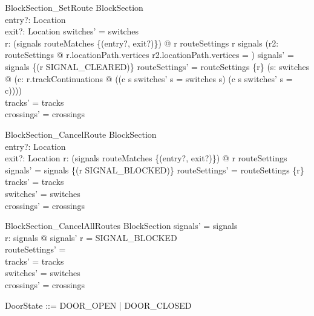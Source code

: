 \begin{schema}{BlockSection\_SetRoute}
  \Delta BlockSection\\
  entry?: Location\\
  exit?: Location
\where
  \dom  switches' = \dom  switches\\
  \exists  r: \dom  (\dom  signals \dres  routeMatches \rres  \{(entry?, exit?)\}) @ r \notin  routeSettings \land  r \in  \dom  signals \land  (\forall  r2: routeSettings @ r.locationPath.vertices \cap  r2.locationPath.vertices = \emptyset) \land  signals' = signals \oplus  \{(r \mapsto  SIGNAL\_CLEARED)\} \land  routeSettings' = routeSettings \cup  \{r\} \land  (\forall  s: \dom  switches @ (\forall  c: r.trackContinuations @ ((c \notin  s \implies  switches' s = switches s) \land  (c \in  s \implies  switches' s = c))))\\
  tracks' = tracks\\
  crossings' = crossings
\end{schema}

\begin{schema}{BlockSection\_CancelRoute}
  \Delta BlockSection\\
  entry?: Location\\
  exit?: Location
\where
  \exists  r: \dom  (\dom  signals \dres  routeMatches \rres  \{(entry?, exit?)\}) @ r \in  routeSettings \land  signals' = signals \oplus  \{(r \mapsto  SIGNAL\_BLOCKED)\} \land  routeSettings' = routeSettings \setminus  \{r\}\\
  tracks' = tracks\\
  switches' = switches\\
  crossings' = crossings
\end{schema}

\begin{schema}{BlockSection\_CancelAllRoutes}
  \Delta BlockSection
\where
  \dom  signals' = \dom  signals\\
  \forall  r: \dom  signals @ signals' r = SIGNAL\_BLOCKED\\
  routeSettings' = \emptyset\\
  tracks' = tracks\\
  switches' = switches\\
  crossings' = crossings
\end{schema}

\begin{zed}
DoorState ::= DOOR\_OPEN | DOOR\_CLOSED
\end{zed}

\begin{zed}
  [HeadCode]
\end{zed}

